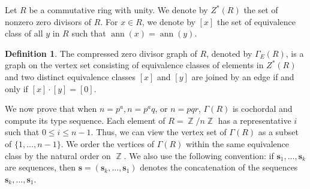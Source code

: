 \documentclass[12pt,amscd]{amsart}
\theoremstyle{definition}
\newtheorem{defn}[thm]{Definition}
\numberwithin{equation}{section}
\DeclareMathOperator{\ZZ}{\mathbb {Z}}
\DeclareMathOperator{\ann}{ann}
\def\s {\mathbf s}
\begin{document}
Let $R$ be a commutative ring with unity. We denote by $Z^*(R)$ the set of nonzero zero divisors of $R$. For $x \in R$, we denote by $[x]$ the set of equivalence class of all $y$ in $R$ such that $\ann(x) = \ann(y)$. 

\begin{defn} The compressed zero divisor graph of $R$, denoted by $\Gamma_E(R)$, is a graph on the vertex set consisting of equivalence classes of elements in $Z^*(R)$ and two distinct equivalence classes $[x]$ and $[y]$ are joined by an edge if and only if $[x] \cdot [y] = [0]$.    
\end{defn}

We now prove that when $n = p^a, n = p^a q$, or $n = pqr$, $\Gamma(R)$ is cochordal and compute its type sequence. Each element of $R = \ZZ / n\ZZ$ has a representative $i$ such that $0 \le i \le n- 1$. Thus, we can view the vertex set of $\Gamma(R)$ as a subset of $\{1,\ldots, n-1\}$. We order the vertices of $\Gamma(R)$ within the same equivalence class by the natural order on $\ZZ$. We also use the following convention: if $\s_1, \ldots, \s_k$ are sequences, then $\s = (\s_k, \ldots, \s_1)$ denotes the concatenation of the sequences $\s_k, \ldots, \s_1$.
\end{document}
